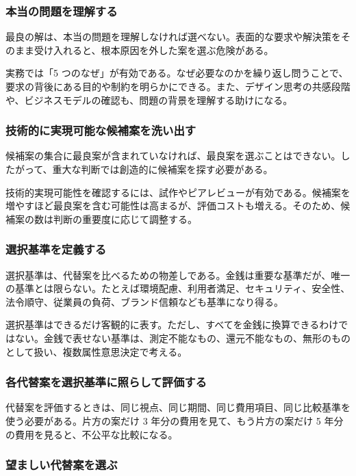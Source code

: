 \documentclass[a4paper,11pt]{ltjsarticle}
\numberwithin{figure}{section}
\numberwithin{table}{section}
\begin{document}
\subsubsection{本当の問題を理解する}

最良の解は、本当の問題を理解しなければ選べない。表面的な要求や解決策をそのまま受け入れると、根本原因を外した案を選ぶ危険がある。

実務では「5 つのなぜ」が有効である。なぜ必要なのかを繰り返し問うことで、要求の背後にある目的や制約を明らかにできる。また、デザイン思考の共感段階や、ビジネスモデルの確認も、問題の背景を理解する助けになる。

\subsubsection{技術的に実現可能な候補案を洗い出す}

候補案の集合に最良案が含まれていなければ、最良案を選ぶことはできない。したがって、重大な判断では創造的に候補案を探す必要がある。

技術的実現可能性を確認するには、試作やピアレビューが有効である。候補案を増やすほど最良案を含む可能性は高まるが、評価コストも増える。そのため、候補案の数は判断の重要度に応じて調整する。

\subsubsection{選択基準を定義する}

選択基準は、代替案を比べるための物差しである。金銭は重要な基準だが、唯一の基準とは限らない。たとえば環境配慮、利用者満足、セキュリティ、安全性、法令順守、従業員の負荷、ブランド信頼なども基準になり得る。

選択基準はできるだけ客観的に表す。ただし、すべてを金銭に換算できるわけではない。金銭で表せない基準は、測定不能なもの、還元不能なもの、無形のものとして扱い、複数属性意思決定で考える。

\subsubsection{各代替案を選択基準に照らして評価する}

代替案を評価するときは、同じ視点、同じ期間、同じ費用項目、同じ比較基準を使う必要がある。片方の案だけ 3 年分の費用を見て、もう片方の案だけ 5 年分の費用を見ると、不公平な比較になる。

\subsubsection{望ましい代替案を選ぶ}
\end{document}
